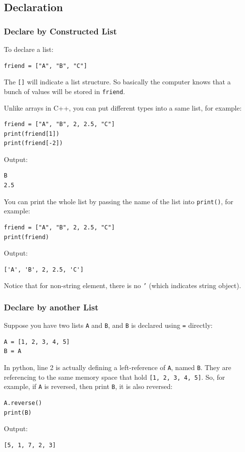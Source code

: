 \documentclass[12pt]{book}
\begin{document}
\subsection{Declaration}
\label{sec:org49e4fd6}
\subsubsection{Declare by Constructed List}
\label{sec:orgc616578}
To declare a list:
\begin{verbatim}
friend = ["A", "B", "C"]
\end{verbatim}
The \texttt{[]} will indicate a list structure. So basically the computer knows that a bunch of values will be stored in \texttt{friend}.

Unlike arrays in C++, you can put different types into a same list, for example:
\begin{verbatim}
friend = ["A", "B", 2, 2.5, "C"]
print(friend[1])
print(friend[-2])
\end{verbatim}
Output:
\begin{verbatim}
B
2.5
\end{verbatim}

You can print the whole list by passing the name of the list into \texttt{print()}, for example:
\begin{verbatim}
friend = ["A", "B", 2, 2.5, "C"]
print(friend)
\end{verbatim}
Output:
\begin{verbatim}
['A', 'B', 2, 2.5, 'C']
\end{verbatim}
Notice that for non-string element, there is no \texttt{'} (which indicates string object).
\subsubsection{Declare by another List}
\label{sec:org7382da0}
Suppose you have two lists \texttt{A} and \texttt{B}, and \texttt{B} is declared using \texttt{=} directly:
\begin{verbatim}
A = [1, 2, 3, 4, 5]
B = A
\end{verbatim}
In python, line 2 is actually defining a left-reference of \texttt{A}, named \texttt{B}. They are referencing to the same memory space that hold \texttt{[1, 2, 3, 4, 5]}. So, for example, if \texttt{A} is reversed, then print \texttt{B}, it is also reversed:
\begin{verbatim}
A.reverse()
print(B)
\end{verbatim}
Output:
\begin{verbatim}
[5, 1, 7, 2, 3]
\end{verbatim}
\end{document}
